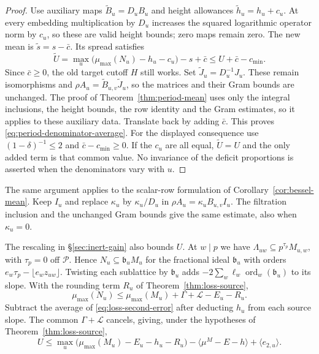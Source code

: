 \begin{proof}
Use auxiliary maps $\widetilde B_u=D_uB_u$ and height allowances
$\widetilde h_u=h_u+c_u$. At every embedding multiplication by
$D_u$ increases the squared logarithmic operator norm by $c_u$,
so these are valid height bounds; zero maps remain zero. The new
mean is $\widetilde s=s-\bar c$. Its spread satisfies
\[
 \widetilde U
 =\max_u\bigl(\mu_{\max}(N_u)-h_u-c_u\bigr)-s+\bar c
 \le U+\bar c-c_{\min}.
\]
Since $\bar c\ge0$, the old target cutoff $H$ still works.
Set $\widetilde J_u=D_u^{-1}J_u$. These remain isomorphisms and
$\rho A_u=\widetilde B_{u,v}\widetilde J_u$, so the matrices and
their Gram bounds are unchanged. The proof of
Theorem~\ref{thm:period-mean} uses only the integral inclusions,
the height bounds, the row identity and the Gram estimates, so it
applies to these auxiliary data. Translate back by adding $\bar c$.
This proves \eqref{eq:period-denominator-average}.
For the displayed consequence use
$(1-\delta)^{-1}\le2$ and $\bar c-c_{\min}\ge0$.
If the $c_u$ are all equal, $\widetilde U=U$ and the only added
term is that common value. No invariance of the deficit proportions
is asserted when the denominators vary with $u$.
\end{proof}

The same argument applies to the scalar-row formulation of
Corollary~\ref{cor:bessel-mean}. Keep $I_u$ and replace
$\kappa_u$ by $\kappa_u/D_u$ in
$\rho A_u=\kappa_u B_{u,v}I_u$. The filtration inclusion and
the unchanged Gram bounds give the same estimate, also when
$\kappa_u=0$.

The rescaling in \S\ref{sec:inert-gain} also bounds $U$. At $w\mid p$
we have $\Lambda_{uw}\subseteq p^{\tau_p}M_{u,w}$, with
$\tau_p=0$ off $\mathcal P$. Hence $N_u\subseteq\mathfrak b_u M_u$ for
the fractional ideal $\mathfrak b_u$ with orders
$e_w\tau_p-\lfloor e_wz_{uw}\rfloor$. Twisting each sublattice by
$\mathfrak b_u$ adds $-2\sum_w\ell_w\operatorname{ord}_w(\mathfrak b_u)$
to its slope. With the rounding term $R_u$ of Theorem~\ref{thm:loss-source},
\[
 \mu_{\max}(N_u)\le\mu_{\max}(M_u)+\Gamma+\mathcal L-E_u-R_u .
\]
Subtract the average of \eqref{eq:loss-second-error} after deducting
$h_u$ from each source slope. The common $\Gamma+\mathcal L$ cancels,
giving, under the hypotheses of Theorem~\ref{thm:loss-source},
\begin{equation}\label{eq:period-spread}
 U\le \max_u\bigl(\mu_{\max}(M_u)-E_u-h_u-R_u\bigr)
        -\langle\mu^M-E-h\rangle+\langle e_{2,u}\rangle .
\end{equation}

